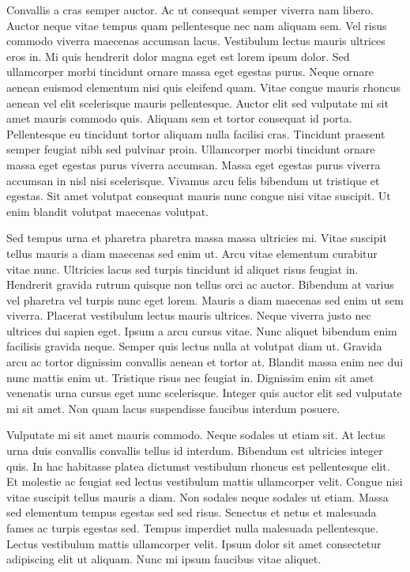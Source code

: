 \documentclass[11pt,a4paper]{article}
\begin{document}
Convallis a cras semper auctor. Ac ut consequat semper viverra nam libero. Auctor neque vitae tempus quam pellentesque nec nam aliquam sem. Vel risus commodo viverra maecenas accumsan lacus. Vestibulum lectus mauris ultrices eros in. Mi quis hendrerit dolor magna eget est lorem ipsum dolor. Sed ullamcorper morbi tincidunt ornare massa eget egestas purus. Neque ornare aenean euismod elementum nisi quis eleifend quam. Vitae congue mauris rhoncus aenean vel elit scelerisque mauris pellentesque. Auctor elit sed vulputate mi sit amet mauris commodo quis. Aliquam sem et tortor consequat id porta. Pellentesque eu tincidunt tortor aliquam nulla facilisi cras. Tincidunt praesent semper feugiat nibh sed pulvinar proin. Ullamcorper morbi tincidunt ornare massa eget egestas purus viverra accumsan. Massa eget egestas purus viverra accumsan in nisl nisi scelerisque. Vivamus arcu felis bibendum ut tristique et egestas. Sit amet volutpat consequat mauris nunc congue nisi vitae suscipit. Ut enim blandit volutpat maecenas volutpat.

Sed tempus urna et pharetra pharetra massa massa ultricies mi. Vitae suscipit tellus mauris a diam maecenas sed enim ut. Arcu vitae elementum curabitur vitae nunc. Ultricies lacus sed turpis tincidunt id aliquet risus feugiat in. Hendrerit gravida rutrum quisque non tellus orci ac auctor. Bibendum at varius vel pharetra vel turpis nunc eget lorem. Mauris a diam maecenas sed enim ut sem viverra. Placerat vestibulum lectus mauris ultrices. Neque viverra justo nec ultrices dui sapien eget. Ipsum a arcu cursus vitae. Nunc aliquet bibendum enim facilisis gravida neque. Semper quis lectus nulla at volutpat diam ut. Gravida arcu ac tortor dignissim convallis aenean et tortor at. Blandit massa enim nec dui nunc mattis enim ut. Tristique risus nec feugiat in. Dignissim enim sit amet venenatis urna cursus eget nunc scelerisque. Integer quis auctor elit sed vulputate mi sit amet. Non quam lacus suspendisse faucibus interdum posuere.

Vulputate mi sit amet mauris commodo. Neque sodales ut etiam sit. At lectus urna duis convallis convallis tellus id interdum. Bibendum est ultricies integer quis. In hac habitasse platea dictumst vestibulum rhoncus est pellentesque elit. Et molestie ac feugiat sed lectus vestibulum mattis ullamcorper velit. Congue nisi vitae suscipit tellus mauris a diam. Non sodales neque sodales ut etiam. Massa sed elementum tempus egestas sed sed risus. Senectus et netus et malesuada fames ac turpis egestas sed. Tempus imperdiet nulla malesuada pellentesque. Lectus vestibulum mattis ullamcorper velit. Ipsum dolor sit amet consectetur adipiscing elit ut aliquam. Nunc mi ipsum faucibus vitae aliquet.
\end{document}
